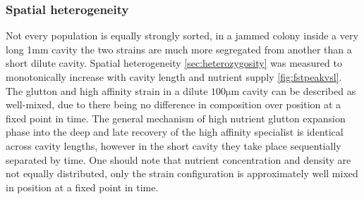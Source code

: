 \documentclass[11pt,a4paper]{report}
\begin{document}
\subsubsection{Spatial heterogeneity}
Not every population is equally strongly sorted, in a jammed colony inside a very long 1mm cavity the two strains are much more segregated from another than a short dilute cavity. Spatial heterogeneity \ref{sec:heterozygosity} was measured to monotonically increase with cavity length and nutrient supply \ref{fig:fstpeakvsl}. The glutton and high affinity strain in a dilute $100 \mathrm{\mu m}$ cavity can be described as well-mixed, due to there being no difference in composition over position at a fixed point in time. The general mechanism of high nutrient glutton expansion phase into the deep and late recovery of the high affinity specialist is identical across cavity lengths, however in the short cavity they take place sequentially separated by time. One should note that nutrient concentration and density are not equally distributed, only the strain configuration is approximately well mixed in position at a fixed point in time.
\newpage
\end{document}
